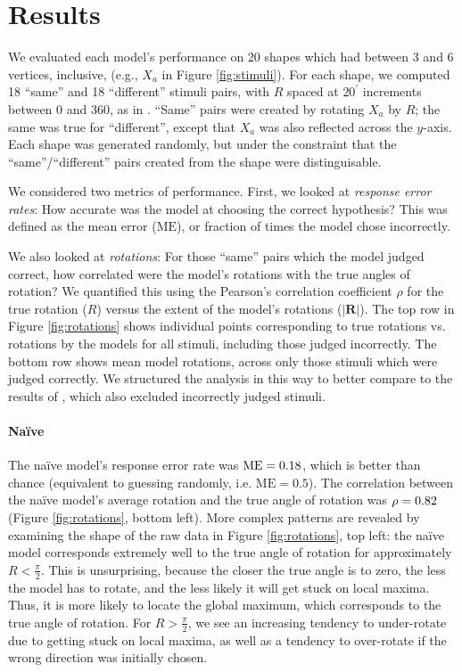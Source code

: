 \documentclass{article} %
\newcommand{\ME}[0]{\mathrm{ME}}
\newcommand{\naive}[0]{na\"ive}
\newcommand{\Naive}[0]{Na\"ive}
\begin{document}
\section{Results}

We evaluated each model's performance on 20 shapes which had between 3
and 6 vertices, inclusive, (e.g., $X_a$ in Figure
\ref{fig:stimuli}). For each shape, we computed 18 ``same'' and 18
``different'' stimuli pairs, with $R$ spaced at $20^\prime$ increments
between 0 and 360, as in \cite{Shepard1971}. ``Same'' pairs were
created by rotating $X_a$ by $R$; the same was true for ``different'',
except that $X_a$ was also reflected across the $y$-axis. Each shape
was generated randomly, but under the constraint that the
``same''/``different'' pairs created from the shape were
distinguisable.

We considered two metrics of performance. First, we looked at
\textit{response error rates}: How accurate was the model at choosing
the correct hypothesis? This was defined as the mean error ($\ME{}$),
or fraction of times the model chose incorrectly.

We also looked at \textit{rotations}: For those ``same'' pairs which
the model judged correct, how correlated were the model's rotations
with the true angles of rotation?  We quantified this using the
Pearson's correlation coefficient $\rho$ for the true rotation ($R$)
versus the extent of the model's rotations ($\vert
\mathbf{R}\vert$). The top row in Figure \ref{fig:rotations} shows
individual points corresponding to true rotations vs. rotations by the
models for all stimuli, including those judged incorrectly. The bottom
row shows mean model rotations, across only those stimuli which were
judged correctly. We structured the analysis in this way to better
compare to the results of \cite{Shepard1971}, which also excluded
incorrectly judged stimuli.

\paragraph{\Naive{}} 

The \naive{} model's response error rate was $\NaiveME{}$, which is
better than chance (equivalent to guessing randomly,
i.e. $\ME{}=0.5$). The correlation between the \naive{} model's
average rotation and the true angle of rotation was $\rho=0.82{}$
(Figure \ref{fig:rotations}, bottom left). More complex patterns are
revealed by examining the shape of the raw data in Figure
\ref{fig:rotations}, top left: the \naive{} model corresponds
extremely well to the true angle of rotation for approximately
$R<\frac{\pi}{2}$. This is unsurprising, because the closer the true
angle is to zero, the less the model has to rotate, and the less
likely it will get stuck on local maxima. Thus, it is more likely to
locate the global maximum, which corresponds to the true angle of
rotation. For $R>\frac{\pi}{2}$, we see an increasing tendency to
under-rotate due to getting stuck on local maxima, as well as a
tendency to over-rotate if the wrong direction was initially chosen.
\end{document}
